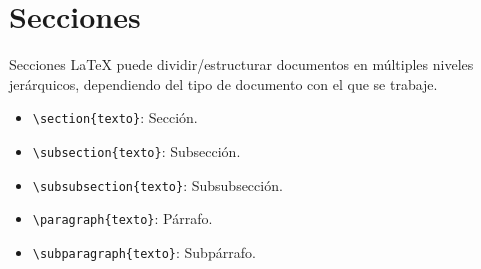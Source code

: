 \documentclass[12pt]{beamer}
\begin{document}
\section{Secciones}
\begin{frame}{Secciones}
  LaTeX puede dividir/estructurar documentos en múltiples niveles jerárquicos, dependiendo del tipo de documento con el que se trabaje.
  \begin{itemize}
    \item<1-> {\color{blue}\texttt{\textbackslash section\{texto\}}}: Secci\'on.
    \item<2-> {\color{blue}\texttt{\textbackslash subsection\{texto\}}}: Subsecci\'on.
    \item<3-> {\color{blue}\texttt{\textbackslash subsubsection\{texto\}}}: Subsubsecci\'on.
    \item <4-> {\color{blue}\texttt{\textbackslash paragraph\{texto\}}}: Párrafo.
    \item <5-> {\color{blue}\texttt{\textbackslash subparagraph\{texto\}}}: Subpárrafo.
  \end{itemize}
\end{frame}
\end{document}
